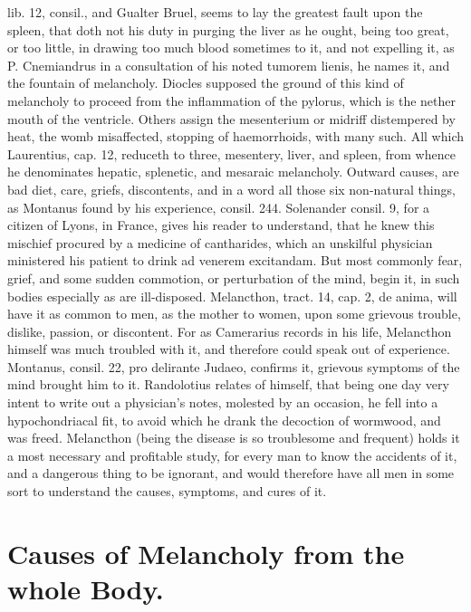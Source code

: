 {lib. 12, consil., and Gualter Bruel, seems to lay the greatest fault
upon the spleen, that doth not his duty in purging the liver as he
ought, being too great, or too little, in drawing too much blood
sometimes to it, and not expelling it, as P. Cnemiandrus in a
consultation of his noted tumorem lienis, he names it, and the
fountain of melancholy. Diocles supposed the ground of this kind of
melancholy to proceed from the inflammation of the pylorus, which is
the nether mouth of the ventricle. Others assign the mesenterium or
midriff distempered by heat, the womb misaffected, stopping of
haemorrhoids, with many such. All which Laurentius, cap. 12, reduceth
to three, mesentery, liver, and spleen, from whence he denominates
hepatic, splenetic, and mesaraic melancholy. Outward causes, are bad
diet, care, griefs, discontents, and in a word all those six
non-natural things, as Montanus found by his experience, consil. 244.
Solenander consil. 9, for a citizen of Lyons, in France, gives his
reader to understand, that he knew this mischief procured by a medicine
of cantharides, which an unskilful physician ministered his patient to
drink ad venerem excitandam. But most commonly fear, grief, and some
sudden commotion, or perturbation of the mind, begin it, in such bodies
especially as are ill-disposed. Melancthon, tract. 14, cap. 2, de
anima, will have it as common to men, as the mother to women, upon some
grievous trouble, dislike, passion, or discontent. For as Camerarius
records in his life, Melancthon himself was much troubled with it, and
therefore could speak out of experience. Montanus, consil. 22, pro
delirante Judaeo, confirms it, grievous symptoms of the mind
brought him to it. Randolotius relates of himself, that being one day
very intent to write out a physician's notes, molested by an occasion,
he fell into a hypochondriacal fit, to avoid which he drank the
decoction of wormwood, and was freed. Melancthon (being the
disease is so troublesome and frequent) holds it a most necessary and
profitable study, for every man to know the accidents of it, and a
dangerous thing to be ignorant, and would therefore have all men in
some sort to understand the causes, symptoms, and cures of it.

\section{Causes of Melancholy from the whole Body.}

}
